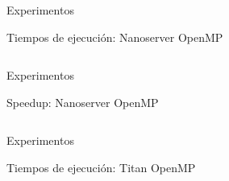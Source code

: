 \begin{frame}{Experimentos}
\begin{block}{Tiempos de ejecución: Nanoserver OpenMP}

\begin{columns}
  \begin{column}{.50\textwidth}
	\centerline{
      }

  \end{column}
  \begin{column}{.50\textwidth}
    \centerline{
      }
  \end{column}
  \end{columns}
\end{block}
\end{frame}

\begin{frame}{Experimentos}
\begin{block}{Speedup: Nanoserver OpenMP}

\begin{columns}
  \begin{column}{.50\textwidth}
	\centerline{
      }

  \end{column}
  \begin{column}{.50\textwidth}
    \centerline{
      }
  \end{column}
  \end{columns}
\end{block}
\end{frame}
\begin{frame}{Experimentos}
\begin{block}{Tiempos de ejecución: Titan OpenMP}

\begin{columns}
  \begin{column}{.50\textwidth}
	\centerline{
      }

  \end{column}
  \begin{column}{.50\textwidth}
    \centerline{
      }
  \end{column}
  \end{columns}
\end{block}
\end{frame}

